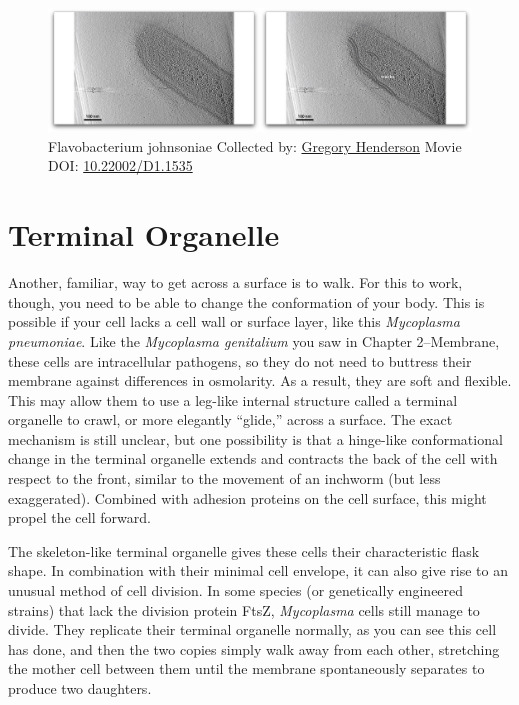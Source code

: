 \documentclass[]{tufte-book}
\begin{document}
\begin{figure}
\includegraphics{movie_stills/6_11} \caption[Flavobacterium johnsoniae Collected by:
\protect\hyperlink{gregory_henderson}{Gregory Henderson} Movie DOI:
\href{https://doi.org/10.22002/D1.1535}{10.22002/D1.1535}]{Flavobacterium johnsoniae Collected by:
\protect\hyperlink{gregory_henderson}{Gregory Henderson} Movie DOI:
\href{https://doi.org/10.22002/D1.1535}{10.22002/D1.1535}}\label{fig:6-11}
\end{figure}

\section{Terminal Organelle}\label{terminal-organelle}

Another, familiar, way to get across a surface is to walk. For this to
work, though, you need to be able to change the conformation of your
body. This is possible if your cell lacks a cell wall or surface layer,
like this \emph{Mycoplasma pneumoniae}. Like the \emph{Mycoplasma
genitalium} you saw in Chapter 2--Membrane, these cells are
intracellular pathogens, so they do not need to buttress their membrane
against differences in osmolarity. As a result, they are soft and
flexible. This may allow them to use a leg-like internal structure
called a terminal organelle to crawl, or more elegantly ``glide,''
across a surface. The exact mechanism is still unclear, but one
possibility is that a hinge-like conformational change in the terminal
organelle extends and contracts the back of the cell with respect to the
front, similar to the movement of an inchworm (but less exaggerated).
Combined with adhesion proteins on the cell surface, this might propel
the cell forward.

The skeleton-like terminal organelle gives these cells their
characteristic flask shape. In combination with their minimal cell
envelope, it can also give rise to an unusual method of cell division.
In some species (or genetically engineered strains) that lack the
division protein FtsZ, \emph{Mycoplasma} cells still manage to divide.
They replicate their terminal organelle normally, as you can see this
cell has done, and then the two copies simply walk away from each other,
stretching the mother cell between them until the membrane spontaneously
separates to produce two daughters.
\end{document}
